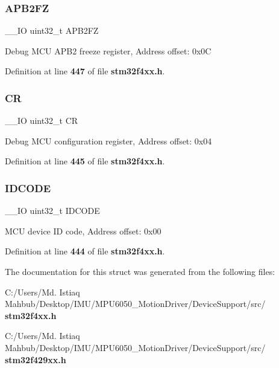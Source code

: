 \mbox{\label{structDBGMCU__TypeDef_a4628a8c32f97ef93b15b2b503ef90c75}} 
\subsubsection{A\+P\+B2\+FZ}
{\footnotesize\ttfamily \+\_\+\+\_\+\+IO uint32\+\_\+t A\+P\+B2\+FZ}

Debug M\+CU A\+P\+B2 freeze register, Address offset\+: 0x0C 

Definition at line \textbf{ 447} of file \textbf{ stm32f4xx.\+h}.

\mbox{\label{structDBGMCU__TypeDef_ab40c89c59391aaa9d9a8ec011dd0907a}} 
\subsubsection{CR}
{\footnotesize\ttfamily \+\_\+\+\_\+\+IO uint32\+\_\+t CR}

Debug M\+CU configuration register, Address offset\+: 0x04 

Definition at line \textbf{ 445} of file \textbf{ stm32f4xx.\+h}.

\mbox{\label{structDBGMCU__TypeDef_a24df28d0e440321b21f6f07b3bb93dea}} 
\subsubsection{I\+D\+C\+O\+DE}
{\footnotesize\ttfamily \+\_\+\+\_\+\+IO uint32\+\_\+t I\+D\+C\+O\+DE}

M\+CU device ID code, Address offset\+: 0x00 

Definition at line \textbf{ 444} of file \textbf{ stm32f4xx.\+h}.



The documentation for this struct was generated from the following files\+:\begin{DoxyCompactItemize}
\item 
C\+:/\+Users/\+Md. Istiaq Mahbub/\+Desktop/\+I\+M\+U/\+M\+P\+U6050\+\_\+\+Motion\+Driver/\+Device\+Support/src/\textbf{ stm32f4xx.\+h}\item 
C\+:/\+Users/\+Md. Istiaq Mahbub/\+Desktop/\+I\+M\+U/\+M\+P\+U6050\+\_\+\+Motion\+Driver/\+Device\+Support/src/\textbf{ stm32f429xx.\+h}\end{DoxyCompactItemize}
